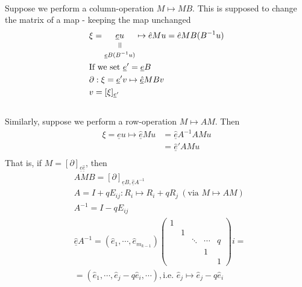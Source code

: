 \documentclass[11pt,a4paper]{report}
\newcommand{\verteq}{\rotatebox{90}{$\,=$}}
\newcommand{\equalto}[2]{\underset{\scriptstyle\overset{\mkern4mu\verteq}{#2}}{#1}}
\begin{document}
              \\
              Suppose we perform a column-operation $M \mapsto MB$. This is supposed to change the matrix of a map - keeping the map unchanged
              \begin{align*}
                &\xi = \equalto{\underline{e}u}{\underline{e} B (B^{-1}u)} \mapsto \hat{e} M u = \hat{e} M B (B^{-1}u)\\
                &\textrm{If we set } \underline{e}' = \underline{e}B\\
                &\partial: \xi = \underline{e}' v \mapsto \underline{\hat{e}} MB v\\
                &v = [\xi]_{\underline{e}'}
              \end{align*}
              \\
              Similarly, suppose we perform a row-operation $M \mapsto AM$. Then
              \begin{align*}
                \xi = \underline{e}u \mapsto \underline{\hat{e}}Mu &= \underline{\hat{e}}A^{-1}AMu\\
                                                           &= \underline{\hat{e}}'AMu\\
              \end{align*}
              That is, if $M = [\partial]_{\underline{e}\underline{\hat{e}}}$, then
              \begin{align*}
                &AMB = [\partial]_{\underline{e}B, \underline{\hat{e}}A^{-1}}\\
                &A = I + qE_{ij}: R_i \mapsto R_i + qR_j \ (\textrm{via } M \mapsto AM)\\
                &A^{-1} = I - qE_{ij}\\
                &\underline{\hat{e}} A^{-1} = (\hat{e}_1, \cdots, \hat{e}_{m_{k-1}})\begin{pmatrix}1 &&&& \\ & 1 &&& \\ && \ddots & \cdots & q\\ &&& 1 &\\ &&&& 1\end{pmatrix}i =\\
                &= (\hat{e}_1, \cdots, \hat{e}_j - q\hat{e}_i, \cdots), \textrm{i.e. } \hat{e}_j \mapsto \hat{e}_j - q\hat{e}_i\\
              \end{align*}
            
\end{document}
